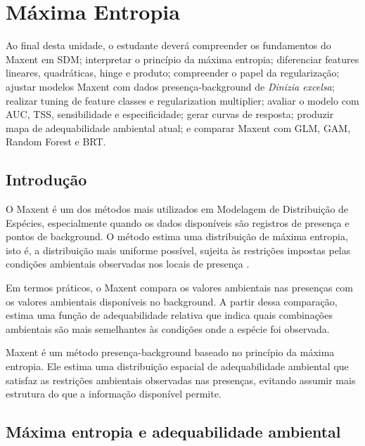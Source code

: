 \chapter[Maxent]{Máxima Entropia}

\begin{objetivos}
	Ao final desta unidade, o estudante deverá compreender os fundamentos do Maxent em SDM; interpretar o princípio da máxima entropia; diferenciar features lineares, quadráticas, hinge e produto; compreender o papel da regularização; ajustar modelos Maxent com dados presença-background de \textit{Dinizia excelsa}; realizar tuning de feature classes e regularization multiplier; avaliar o modelo com AUC, TSS, sensibilidade e especificidade; gerar curvas de resposta; produzir mapa de adequabilidade ambiental atual; e comparar Maxent com GLM, GAM, Random Forest e BRT.
\end{objetivos}

\section{Introdução}

O Maxent é um dos métodos mais utilizados em Modelagem de Distribuição de Espécies, especialmente quando os dados disponíveis são registros de presença e pontos de background. O método estima uma distribuição de máxima entropia, isto é, a distribuição mais uniforme possível, sujeita às restrições impostas pelas condições ambientais observadas nos locais de presença \parencite{phillips2006maximum,phillips2008modeling,elith2011statistical,merow2013practical,guisan2017habitat}.

Em termos práticos, o Maxent compara os valores ambientais nas presenças com os valores ambientais disponíveis no background. A partir dessa comparação, estima uma função de adequabilidade relativa que indica quais combinações ambientais são mais semelhantes às condições onde a espécie foi observada.

\begin{conceito}[title={\faBook\quad Maxent em SDM}]
	Maxent é um método presença-background baseado no princípio da máxima entropia. Ele estima uma distribuição espacial de adequabilidade ambiental que satisfaz as restrições ambientais observadas nas presenças, evitando assumir mais estrutura do que a informação disponível permite.
\end{conceito}

\section{Máxima entropia e adequabilidade ambiental}

